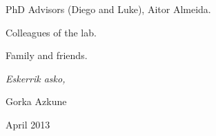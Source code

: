 


\begin{acknowledgements}      
PhD Advisors (Diego and Luke), Aitor Almeida.

Colleagues of the lab.

Family and friends.


\begin{flushright}
\textit{Eskerrik asko,}

Gorka Azkune

April 2013







\end{flushright}



\end{acknowledgements}



